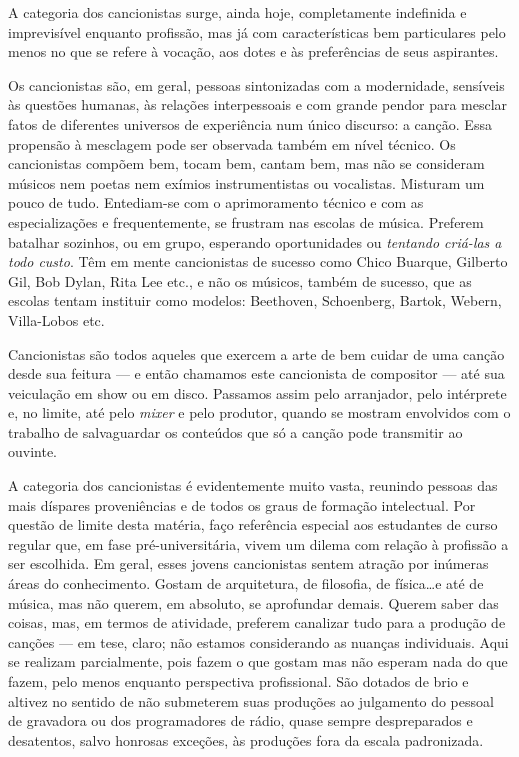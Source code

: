 A categoria dos cancionistas surge, ainda hoje, completamente indefinida
e imprevisível enquanto profissão, mas já com características bem
particulares pelo menos no que se refere à vocação, aos dotes e às
preferências de seus aspirantes.

Os cancionistas são, em geral, pessoas sintonizadas com a modernidade,
sensíveis às questões humanas, às relações interpessoais e com grande
pendor para mesclar fatos de diferentes universos de experiência num
único discurso: a canção. Essa propensão à mesclagem pode ser observada
também em nível técnico. Os cancionistas compõem bem, tocam bem, cantam
bem, mas não se consideram músicos nem poetas nem exímios
instrumentistas ou vocalistas. Misturam um pouco de tudo. Entediam-se
com o aprimoramento técnico e com as especializações e frequentemente,
se frustram nas escolas de música. Preferem batalhar sozinhos, ou em
grupo, esperando oportunidades ou \textit{tentando criá-las a todo custo}. Têm
em mente cancionistas de sucesso como Chico Buarque, Gilberto Gil, Bob
Dylan, Rita Lee etc., e não os músicos, também de sucesso, que as
escolas tentam instituir como modelos: Beethoven, Schoenberg, Bartok,
Webern, Villa-Lobos etc.

Cancionistas são todos aqueles que exercem a arte de bem cuidar de uma
canção desde sua feitura --- e então chamamos este cancionista de compositor ---
até sua veiculação em show ou em disco. Passamos assim pelo arranjador,
pelo intérprete e, no limite, até pelo \textit{mixer} e pelo produtor, quando
se mostram envolvidos com o trabalho de salvaguardar os conteúdos que só
a canção pode transmitir ao ouvinte.

A categoria dos cancionistas é evidentemente muito vasta, reunindo
pessoas das mais díspares proveniências e de todos os graus de formação
intelectual. Por questão de limite desta matéria, faço referência
especial aos estudantes de curso regular que, em fase pré-universitária,
vivem um dilema com relação à profissão a ser escolhida. Em geral, esses
jovens cancionistas sentem atração por inúmeras áreas do conhecimento.
Gostam de arquitetura, de filosofia, de física\ldots e até de música, mas
não querem, em absoluto, se aprofundar demais. Querem saber das coisas,
mas, em termos de atividade, preferem canalizar tudo para a produção de
canções --- em tese, claro; não estamos considerando as nuanças
individuais. Aqui se realizam parcialmente, pois fazem o que gostam mas
não esperam nada do que fazem, pelo menos enquanto perspectiva
profissional. São dotados de brio e altivez no sentido de não submeterem
suas produções ao julgamento do pessoal de gravadora ou dos
programadores de rádio, quase sempre despreparados e desatentos, salvo honrosas exceções, às
produções fora da escala padronizada.

